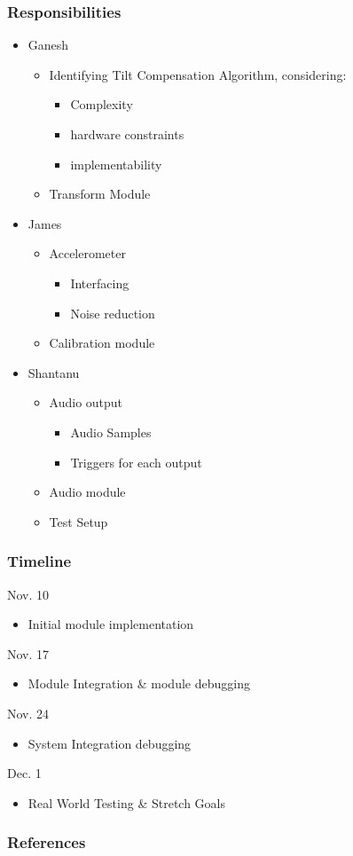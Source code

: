 \documentclass{beamer}
\begin{document}
\begin{frame}
\frametitle{Responsibilities}
\begin{itemize}
	\item{Ganesh}
	\begin{itemize}
		\item Identifying Tilt Compensation Algorithm, considering:
		\begin{itemize}
			\item Complexity
			\item hardware constraints
			\item implementability
		\end{itemize}
		\item Transform Module
	\end{itemize}
	\item{James}
	\begin{itemize}
		\item Accelerometer
		\begin{itemize}
			\item Interfacing
			\item Noise reduction
		\end{itemize}
		\item Calibration module
	\end{itemize}
	\item{Shantanu}
	\begin{itemize}
		\item Audio output
		\begin{itemize}
			\item Audio Samples
			\item Triggers for each output
		\end{itemize}
		\item Audio module
		\item Test Setup
	\end{itemize}
\end{itemize}
\end{frame}

\begin{frame}
\frametitle{Timeline}
\begin{description}
	\item{Nov. 10}
	\begin{itemize}
		\item Initial module implementation
	\end{itemize}
	\item{Nov. 17}
	\begin{itemize}
		\item Module Integration & module debugging
	\end{itemize}
	\item{Nov. 24}
	\begin{itemize}
		\item System Integration debugging
	\end{itemize}
	\item{Dec. 1}
	\begin{itemize}
		\item Real World Testing & Stretch Goals
	\end{itemize}
\end{description}
\end{frame}

\begin{frame}
\frametitle{References}


\end{frame}
\end{document}
